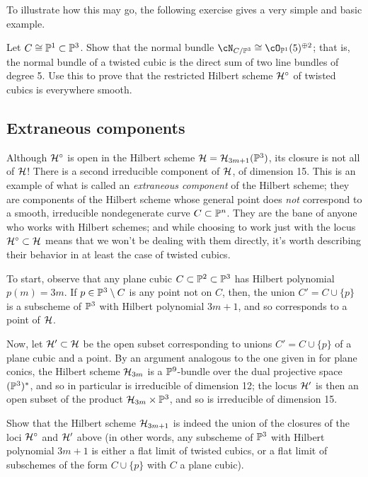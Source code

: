 To illustrate how this may go, the following exercise gives a very simple and basic example.

\begin{exercise}\label{twisted cubic normal bundle}
Let $C \cong \PP^1 \subset \PP^3$. Show that the normal bundle $\cN_{C/\PP^3} \cong \cO_{\PP^1}(5)^{\oplus 2}$; that is, the normal bundle of a twisted cubic is the direct sum of two line bundles of degree 5. Use this to prove that the restricted Hilbert scheme $\cH^\circ$ of twisted cubics is everywhere smooth.
\end{exercise}

\subsection{Extraneous components}


Although $\cH^\circ$ is open in the Hilbert scheme $\cH = \cH_{3m+1}(\PP^3)$, its closure is not all of $\cH$! There is a second irreducible component of $\cH$, of dimension 15. This is an example of what is called an \emph{extraneous component} of the Hilbert scheme; they are components of the Hilbert scheme whose general point does \emph{not} correspond to a smooth, irreducible nondegenerate curve $C \subset \PP^n$. They are the bane of anyone who works with Hilbert schemes; and while choosing to work just with the locus $\cH^\circ \subset \cH$ means that we won't be dealing with them directly, it's worth describing their behavior in at least the case of twisted cubics.


To start, observe that any plane cubic $C \subset \PP^2 \subset \PP^3$ has Hilbert polynomial $p(m) = 3m$. If $p \in \PP^3 \setminus C$ is any point not on $C$, then, the union $C' = C \cup \{p\}$ is a subscheme of $\PP^3$ with Hilbert polynomial $3m+1$, and so corresponds to a point of $\cH$. 

Now, let $\cH' \subset \cH$ be the open subset corresponding to unions $C' = C \cup \{p\}$ of a plane cubic and a point. By an argument analogous to the one given in \cite{3264} for plane conics, the Hilbert scheme $\cH_{3m}$ is a $\PP^9$-bundle over the dual projective space $(\PP^3)^*$, and so in particular is irreducible of dimension 12; the locus $\cH'$ is then an open subset of the product $\cH_{3m} \times \PP^3$, and so is irreducible of dimension 15. 

\begin{exercise}
Show that the Hilbert scheme $\cH_{3m+1}$ is indeed the union of the closures of the loci $\cH^\circ$ and $\cH'$ above (in other words, any subscheme of $\PP^3$ with Hilbert polynomial $3m+1$ is either a flat limit of twisted cubics, or a flat limit of subschemes of the form $C \cup \{p\}$ with $C$ a plane cubic).
\end{exercise}

